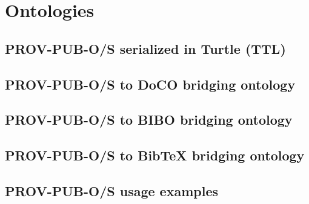  
\appendix    %

\chapter{Ontologies}
\section{PROV-PUB-O/S serialized in Turtle (TTL)}

\section{PROV-PUB-O/S to DoCO bridging ontology}

\section{PROV-PUB-O/S to BIBO bridging ontology}

\section{PROV-PUB-O/S to BibTeX bridging ontology}

\section{PROV-PUB-O/S usage examples}



% 

